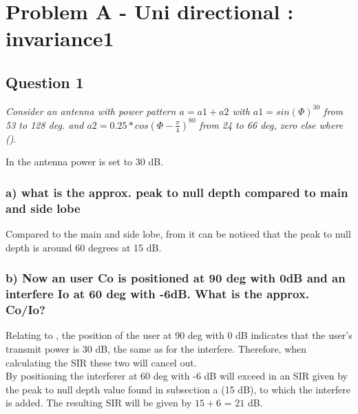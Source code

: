 \section{Problem A - Uni directional : invariance1} \label{sec:mm4_PbA}

\subsection{Question 1}
\textit{Consider an antenna with power pattern $a=a1+a2$ with $a1=sin(\Phi)^{30}$ from 53 to 128 deg. and $a2=0.25*cos(\Phi - \frac{\pi}{4})^{80}$ from 24 to 66 deg, zero else where ()}.

In  the antenna power is set to 30 dB.

\subsubsection{a) what is the approx. peak to null depth compared to main and side lobe}

Compared to the main and side lobe, from  it can be noticed that the peak to null depth is around 60 degrees at 15 dB.

\subsubsection{b) Now an user Co is positioned at 90 deg with 0dB and an interfere Io at 60 deg with -6dB. What is the approx. Co/Io?}

Relating to , the position of the user at 90 deg with 0 dB indicates that the user's transmit power is 30 dB, the same as for the interfere. Therefore, when calculating the SIR these two will cancel out.\\

By positioning the interferer at 60 deg with -6 dB will exceed in an SIR given by the peak to null depth value found in subsection a (15 dB), to which the interfere is added. The resulting SIR will be given by $15 + 6$ = $21$ dB.
